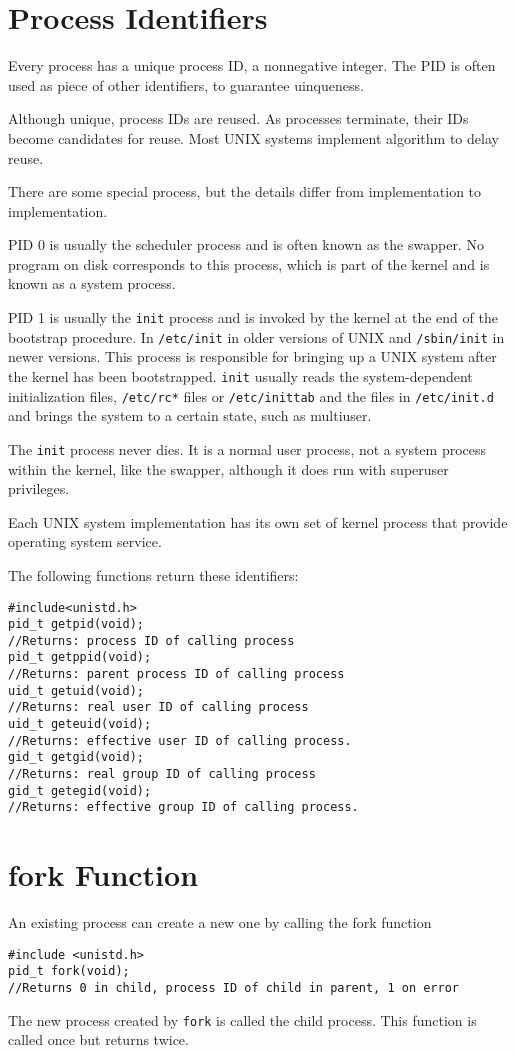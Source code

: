 \documentclass[a4paper,10pt]{book}
\begin{document}
\section{Process Identifiers}
Every process has a unique process ID, a nonnegative integer. The PID is often
used as piece of other identifiers, to guarantee uinqueness.

Although unique, process IDs are reused. As processes terminate, their IDs
become candidates for reuse. Most UNIX systems implement algorithm to delay
reuse.

There are some special process, but the details differ from implementation to
implementation. 

PID 0 is usually the scheduler process and is often known as the
swapper. No program on disk corresponds to this process, which is part of the
kernel and is known as a system process. 

PID 1 is usually the \verb|init| process and is invoked by the kernel at the end
of the bootstrap procedure. In \verb|/etc/init| in older versions of UNIX and
\verb|/sbin/init| in newer versions. This process is responsible for bringing up
a UNIX system after the kernel has been bootstrapped. \verb|init| usually reads
the system-dependent initialization files, \verb|/etc/rc*| files or
\verb|/etc/inittab| and the files in \verb|/etc/init.d| and brings the system to
a certain state, such as multiuser.

The \verb|init| process never dies. It is a normal user process, not a system
process within the kernel, like the swapper, although it does run with superuser
privileges.

Each UNIX system implementation has its own set of kernel process that provide
operating system service. 

The following functions return these identifiers:
\begin{verbatim}
#include<unistd.h>
pid_t getpid(void);
//Returns: process ID of calling process
pid_t getppid(void);
//Returns: parent process ID of calling process
uid_t getuid(void);
//Returns: real user ID of calling process
uid_t geteuid(void);
//Returns: effective user ID of calling process. 
gid_t getgid(void);
//Returns: real group ID of calling process
gid_t getegid(void);
//Returns: effective group ID of calling process.
\end{verbatim}
\section{fork Function}
An existing process can create a new one by calling the fork function
\begin{verbatim}
#include <unistd.h>
pid_t fork(void);
//Returns 0 in child, process ID of child in parent, 1 on error
\end{verbatim}
The new process created by \verb|fork| is called the child process.  
This function is called once but returns twice. 
\end{document}
